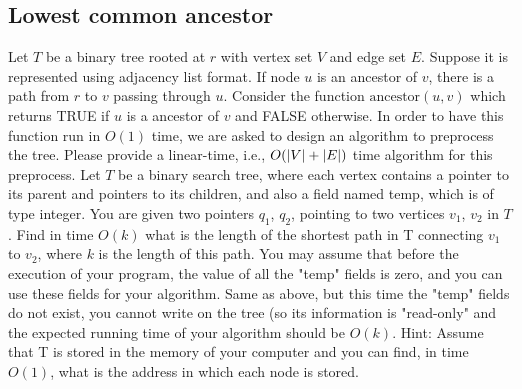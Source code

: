 \subsection{Lowest common ancestor}
\begin{Exercise}
\Question Let $T$ be a binary tree rooted at $r$ with vertex set $V$ and edge set $E$. Suppose it is represented using adjacency list format. If node $u$ is an ancestor of $v$, there is a path from $r$ to $v$ passing through $u$. Consider the function $\text{ancestor}(u, v)$ which returns TRUE if $u$ is a ancestor of $v$ and FALSE otherwise. In order to have this function run in $O(1)$ time, we are asked to design an algorithm to preprocess the tree. Please provide a linear-time, i.e., $O(\lvert V\rvert + \lvert E\rvert)$ time algorithm for this preprocess.  \label{lca:1}
\Question \label{lca:2}
\subQuestion Let $T$ be a binary search tree, where each vertex contains a pointer to its parent and pointers to its children, and also a field named temp, which is of type integer. You are given two pointers $q_1$, $q_2$, pointing to two vertices $v_1$, $v_2$ in $T$. Find in time $O(k)$ what is the length of the shortest path in T connecting $v_1$ to $v_2$, where $k$ is the length of this path. You may assume that before the execution of your program, the value of all the "temp" fields is zero, and you can use these fields for your algorithm. \label{lca:21}
\subQuestion Same as above, but this time the "temp" fields do not exist, you cannot write on the tree (so its information is "read-only" and the expected running time of your algorithm should be $O(k)$. \label{lca:22}
Hint: Assume that T is stored in the memory of your computer and you can find, in time $O(1)$, what is the address in which each node is stored. 
\end{Exercise}
